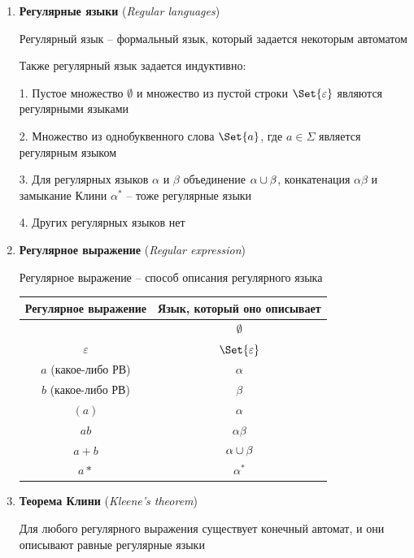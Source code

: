 \documentclass[12pt]{article}
\begin{document}
\begin{enumerate}
        \item \textbf{Регулярные языки} (\textit{Regular languages})

        Регулярный язык -- формальный язык, который задается некоторым автоматом

        Также регулярный язык задается индуктивно:

        1. Пустое множество $\emptyset$ и множество из пустой строки $\Set{\varepsilon}$ являются регулярными языками

        2. Множество из однобуквенного слова $\Set{a}$, где $a \in \Sigma$ является регулярным языком

        3. Для регулярных языков $\alpha$ и $\beta$ объединение $\alpha \cup \beta$, конкатенация $\alpha\beta$ и замыкание Клини $\alpha^*$ -- тоже регулярные языки

        4. Других регулярных языков нет

        \item \textbf{Регулярное выражение} (\textit{Regular expression})

        Регулярное выражение -- способ описания регулярного языка

        \begin{tabular}{c|c}
            Регулярное выражение & Язык, который оно описывает \\
            \hline
            & $\emptyset$                 \\
            $\varepsilon$        & $\Set{\varepsilon}$         \\
            $a$ (какое-либо РВ)  & $\alpha$                    \\
            $b$ (какое-либо РВ)  & $\beta$                     \\
            $(a)$                & $\alpha$                    \\
            $ab$                 & $\alpha\beta$               \\
            $a + b$              & $\alpha \cup \beta$       \\
            $a*$                 & $\alpha^*$                  \\

        \end{tabular}

        \item \textbf{Теорема Клини} (\textit{Kleene's theorem})

        Для любого регулярного выражения существует конечный автомат, и они описывают равные регулярные языки


\end{enumerate}
\end{document}
